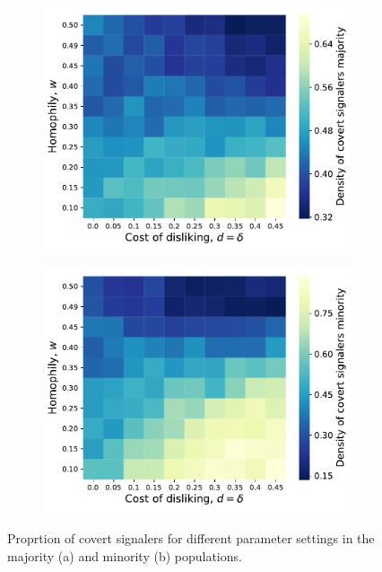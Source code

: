 \documentclass[11pt,letterpaper]{article}
\begin{document}
\begin{figure}[H]
  \centering
  \begin{subfigure}{0.49\textwidth}
    \centering
    \includegraphics[width=\textwidth]{prelim/Figures/majority_signalers.pdf}
    \caption{}
    \label{fig:}
  \end{subfigure}
  \begin{subfigure}{0.49\textwidth}
    \centering
    \includegraphics[width=\textwidth]{prelim/Figures/minority_signalers.pdf}
    \caption{}
    \label{fig:}
  \end{subfigure}
  \caption{Proprtion of covert signalers for different parameter settings in the
    majority (a) and minority (b) populations.}
  \label{fig:regressions}
\end{figure}
\end{document}

